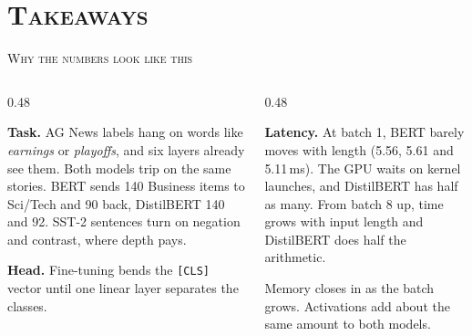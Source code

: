 \documentclass[xcolor={dvipsnames,table}, aspectratio=1610]{beamer}
\begin{document}
\section{\textsc{Takeaways}}

\begin{frame}{\textsc{Why the numbers look like this}}

  \begin{columns}[T]
    \begin{column}{0.48\linewidth}
      \begin{DefinitionBox}
        \scriptsize\textbf{Task.} AG News labels hang on words like
        \emph{earnings} or \emph{playoffs}, and six layers already see them.
        Both models trip on the same stories. BERT sends 140 Business items to
        Sci/Tech and 90 back, DistilBERT 140 and 92. SST-2 sentences turn on
        negation and contrast, where depth pays.
      \end{DefinitionBox}
      \begin{DefinitionBox}
        \scriptsize\textbf{Head.} Fine-tuning bends the \texttt{[CLS]} vector
        until one linear layer separates the classes.
      \end{DefinitionBox}
    \end{column}
    \begin{column}{0.48\linewidth}
      \begin{DefinitionBox}
        \scriptsize\textbf{Latency.} At batch 1, BERT barely moves with length
        (5.56, 5.61 and 5.11\,ms). The GPU waits on kernel launches, and
        DistilBERT has half as many. From batch 8 up, time grows with input
        length and DistilBERT does half the arithmetic.
      \end{DefinitionBox}
      \begin{CommentBox}
        \scriptsize Memory closes in as the batch grows. Activations add about
        the same amount to both models.
      \end{CommentBox}
    \end{column}
  \end{columns}

\end{frame}
\end{document}
